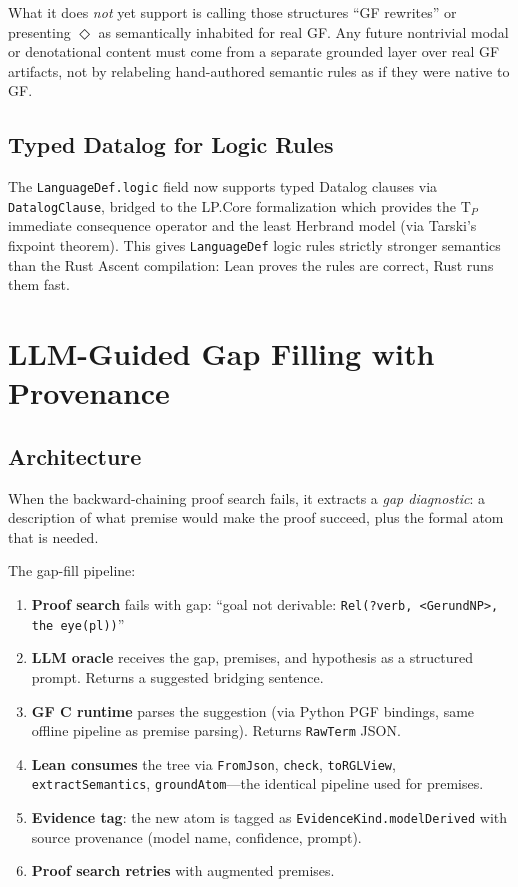 \documentclass[]{article}
\newcommand{\code}[1]{\texttt{#1}}
\begin{document}
What it does \emph{not} yet support is calling those structures
``GF rewrites'' or presenting $\Diamond$ as semantically inhabited for
real GF.  Any future nontrivial modal or denotational content must come
from a separate grounded layer over real GF artifacts, not by
relabeling hand-authored semantic rules as if they were native to GF.

\subsection{Typed Datalog for Logic Rules}

The \code{LanguageDef.logic} field now supports typed Datalog clauses
via \code{DatalogClause}, bridged to the LP.Core formalization which
provides the T$_P$ immediate consequence operator and the least
Herbrand model (via Tarski's fixpoint theorem).  This gives
\code{LanguageDef} logic rules strictly stronger semantics than the
Rust Ascent compilation: Lean proves the rules are correct, Rust
runs them fast.

\section{LLM-Guided Gap Filling with Provenance}
\label{sec:gapfill}

\subsection{Architecture}

When the backward-chaining proof search fails, it extracts a
\emph{gap diagnostic}: a description of what premise would make the
proof succeed, plus the formal atom that is needed.

The gap-fill pipeline:
\begin{enumerate}
\item \textbf{Proof search} fails with gap: ``goal not derivable:
  \code{Rel(?verb, <GerundNP>, the eye(pl))}''
\item \textbf{LLM oracle} receives the gap, premises, and hypothesis
  as a structured prompt. Returns a suggested bridging sentence.
\item \textbf{GF C runtime} parses the suggestion (via Python PGF
  bindings, same offline pipeline as premise parsing). Returns
  \code{RawTerm} JSON.
\item \textbf{Lean consumes} the tree via \code{FromJson},
  \code{check}, \code{toRGLView}, \code{extractSemantics},
  \code{groundAtom}---the identical pipeline used for premises.
\item \textbf{Evidence tag}: the new atom is tagged as
  \code{EvidenceKind.modelDerived} with source provenance
  (model name, confidence, prompt).
\item \textbf{Proof search retries} with augmented premises.
\end{enumerate}
\end{document}
